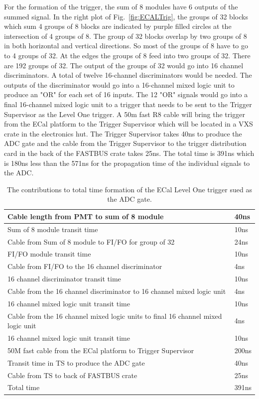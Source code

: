 \documentclass[]{article}
\begin{document}
 For the formation of the trigger, the sum of 8 modules have 6 outputs of the summed signal.
 In the right plot of Fig.~\ref{fig:ECALTrig}, the groups of 32 blocks which sum 4 groups of
 8 blocks are indicated by purple filled circles at the intersection of 4 groups of 8. 
 The group of 32 blocks overlap
 by two groups of 8 in both horizontal and vertical directions. So most of the
 groups of 8 have to go to 4 groups of 32. At the edges the groups of 8 feed into
 two groups of 32. There are 192  groups of 32. The output of the groups of 32 would go into 16 channel
 discriminators. A total of twelve 16-channel discriminators would be needed. The  outputs of the
 discriminator would go into a 16-channel mixed logic unit to produce an "OR" for each set of
 16 inputs. The 12 "OR" signals would go into a final 16-channel mixed logic unit to 
 a trigger that needs to be sent to the Trigger Supervisor as the Level One trigger. A 50m fast R8 cable will bring the trigger from the ECal platform to the Trigger Supervisor
 which will be located in a VXS crate in the electronics hut. The Trigger Supervisor
 takes 40ns to produce the ADC gate and the cable from the Trigger Supervisor to the
 trigger distribution card in the back of the FASTBUS crate takes 25ns. The total time
 is 391ns which is 180ns less than the 571ns for the propagation time of the individual
 signals to the ADC.
 
 \begin{table}
 	\begin{tabular}{|l|l|} \hline
 		Cable length from PMT to sum of 8 module & 40ns \\ \hline
 		Sum of 8 module transit time & 10ns \\ \hline
 		Cable from Sum of 8 module to FI/FO for group of 32 & 24ns \\ \hline
 		FI/FO module transit time & 10ns \\ \hline
 		Cable from FI/FO to the 16 channel discriminator & 4ns \\ \hline
 		 16 channel discriminator  transit time & 10ns \\ \hline
 		 Cable from the 16 channel discriminator to 16 channel mixed logic unit& 4ns \\ \hline
  		 16 channel mixed logic unit  transit time & 10ns \\ \hline
  		 Cable from the 16 channel mixed logic units to final 16 channel mixed logic unit& 4ns \\ \hline
  		 16 channel mixed logic unit  transit time & 10ns \\ \hline
  		 50M fast cable from the ECal platform to Trigger Supervisor & 200ns \\ \hline
  		 Transit time in TS to produce the ADC gate & 40ns \\ \hline
  		 Cable from TS to back of FASTBUS crate & 25ns \\ \hline\hline
  		 Total time & 391ns \\ \hline  		   		  		 		 
 	\end{tabular}
 	\caption{The contributions to total time formation of the ECal Level One trigger sued as the ADC gate.}
 	\label{tab:ECALTrigtime}
 \end{table}
 
\end{document}
